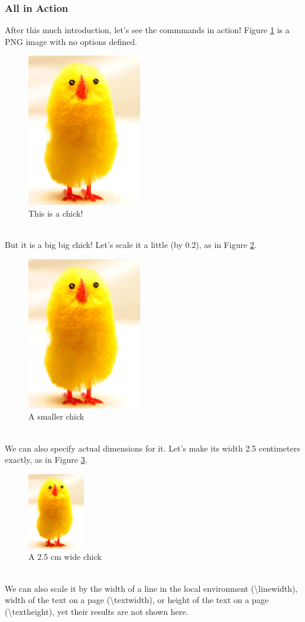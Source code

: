 \documentclass[10pt, a4paper]{article}
\begin{document}
\subsubsection{All in Action}
After this much introduction, let's see the commmands in action! Figure \ref{chickPNG} is a PNG image with no options defined.\\
\begin{figure}[htbp]
\centering
\includegraphics{images/chick1}
\caption{This is a chick!\label{chickPNG}}
\end{figure}
\\ But it is a big big chick! Let's scale it a little (by 0.2), as in Figure \ref{smallChickPNG}.
\begin{figure}[htbp]
\centering
\includegraphics[scale=0.3]{images/chick1}
\caption{A smaller chick\label{smallChickPNG}}
\end{figure}
\\ We can also specify actual dimensions for it. Let's make its width 2.5 centimeters exactly, as in Figure \ref{chick25}.
\begin{figure}[htbp]
\centering
\includegraphics[width=2.5cm]{images/chick1}
\caption{A 2.5 cm wide chick \label{chick25}}
\end{figure}
\\ We can also scale it by the width of a line in the local environment (\textbackslash linewidth), width of the text on a page (\textbackslash textwidth), or height of the text on a page (\textbackslash textheight), yet their results are not shown here. 
\end{document}
